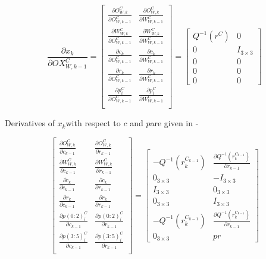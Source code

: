\begin{equation}
\frac{\partial x_{k}}{\partial OX_{W, k-1}^{C}}=\begin{bmatrix}
\frac{\partial O_{W,k}^{C}}{\partial O_{W,k-1}^{C}} & 
\frac{\partial O_{W,k}^{C}}{\partial W_{W,k-1}^{C}} \\
\frac{\partial W_{W,k}^{C}}{\partial O_{W,k-1}^{C}} & 
\frac{\partial W_{W,k}^{C}}{\partial W_{W,k-1}^{C}} \\
\frac{\partial c_{k}}{\partial O_{W,k-1}^{C}} &
\frac{\partial c_{k}}{\partial W_{W,k-1}^{C}} \\
\frac{\partial r_{k}}{\partial O_{W,k-1}^{C}} &
\frac{\partial r_{k}}{\partial W_{W,k-1}^{C}} \\
\frac{\partial p_{i}^{C}}{\partial O_{W,k-1}^{C}} & 
\frac{\partial p_{i}^{C}}{\partial W_{W,k-1}^{C}} \\
\end{bmatrix}= \begin{bmatrix}
Q^{-1}(r^{C}) & 0 \\
0 & I_{3\times 3} \\
0 & 0 \\
0 & 0 \\
0 & 0 
\end{bmatrix}
\end{equation}


Derivatives of $x_{k}$with respect to $c$ and $p$are given in - 


\begin{equation}
\begin{bmatrix}
\frac{\partial O_{W,k}^{C}}{\partial c_{k-1}} & 
\frac{\partial O_{W,k}^{C}}{\partial r_{k-1}} \\
\frac{\partial W_{W,k}^{C}}{\partial c_{k-1}} &
\frac{\partial W_{W,k}^{C}}{\partial r_{k-1}} \\
\frac{\partial c_{k}}{\partial c_{k-1}} & 
\frac{\partial c_{k}}{\partial r_{k-1}} \\
\frac{\partial r_{k}}{\partial c_{k-1}} & 
\frac{\partial r_{k}}{\partial r_{k-1}} \\
\frac{\partial p(0:2)_{i}^{C}}{\partial c_{k-1}} & 
\frac{\partial p(0:2)_{i}^{C}}{\partial r_{k-1}} \\
\frac{\partial p(3:5)_{i}^{C}}{\partial c_{k-1}} & 
\frac{\partial p(3:5)_{i}^{C}}{\partial r_{k-1}} \\
\end{bmatrix}= \begin{bmatrix}
-Q^{-1}(r_{k}^{C_{k-1}}) & 
\frac{\partial Q^{-1}(r_{k}^{C_{k-1}})}{\partial r_{k-1}} \\
0_{3\times 3} & -I_{3\times 3} \\
I_{3\times 3} & 0_{3\times 3} \\
0_{3\times 3} & I_{3\times 3} \\
-Q^{-1}(r_{k}^{C_{k-1}}) & 
\frac{\partial Q^{-1}(r_{k}^{C_{k-1}})}{\partial r_{k-1}} \\
0_{3\times 3} & pr 
\end{bmatrix}
\end{equation}

